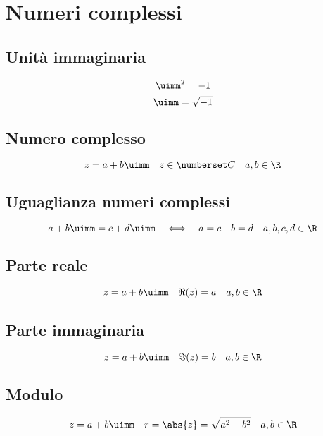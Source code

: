 \chapter{Numeri complessi}
\section{Unità immaginaria}
\begin{equation*}
\uimm^2=-1
\end{equation*}
\begin{equation*}
\uimm=\sqrt{-1}
\end{equation*}
\section{Numero complesso}
\begin{equation*}
z=a+b\uimm\quad z\in\Co\quad a,b\in\R
\end{equation*}
\section{Uguaglianza numeri complessi}
\begin{equation*}
a+b\uimm=c+d\uimm\quad\Longleftrightarrow\quad a=c\quad b=d  \quad a,b,c,d\in\R
\end{equation*}
\section{Parte reale}
\begin{equation*}
z=a+b\uimm\quad\Re(z)=a\quad a,b\in\R
\end{equation*}
\section{Parte immaginaria}
\begin{equation*}
z=a+b\uimm\quad\Im(z)=b\quad a,b\in\R
\end{equation*}
\section{Modulo}
\begin{equation*}
z=a+b\uimm\quad r=\abs{z}=\sqrt{a^2+b^2}\quad a,b\in\R
\end{equation*}
